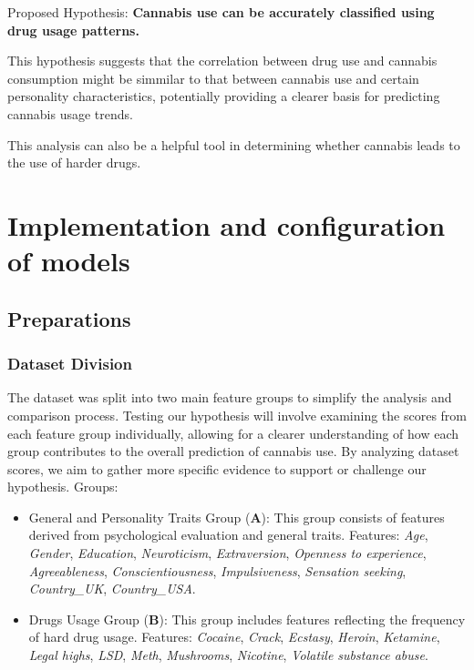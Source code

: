 \documentclass{article}
\begin{document}
Proposed Hypothesis: \textbf{Cannabis use can be accurately classified using drug usage patterns.}

This hypothesis suggests that the correlation between drug use and cannabis consumption might be simmilar to that between cannabis use and certain personality characteristics, potentially providing a clearer basis for predicting cannabis usage trends.

This analysis can also be a helpful tool in determining whether cannabis leads to the use of harder drugs.


\section{Implementation and configuration of models}

\subsection{Preparations}
\subsubsection {Dataset Division}
\hspace{1cm}The dataset was split into two main feature groups to simplify the analysis and comparison process. Testing our hypothesis will involve examining the scores from each feature group individually, allowing for a clearer understanding of how each group contributes to the overall prediction of cannabis use. By analyzing dataset scores, we aim to gather more specific evidence to support or challenge our hypothesis. Groups:
\begin{itemize}

\item General and Personality Traits Group (\textbf{A}):
    This group consists of features derived from psychological evaluation and general traits. \newline Features: \textit{Age}, \textit{Gender}, \textit{Education}, \textit{Neuroticism}, \textit{Extraversion}, \textit{Openness to experience}, \textit{Agreeableness}, \textit{Conscientiousness}, \textit{Impulsiveness}, \textit{Sensation seeking}, \textit{Country\_UK}, \textit{Country\_USA}.

\item Drugs Usage Group (\textbf{B}):
    This group includes features reflecting the frequency of hard drug usage.
    \newline Features: \textit{Cocaine}, \textit{Crack}, \textit{Ecstasy}, \textit{Heroin}, \textit{Ketamine}, \textit{Legal highs}, \textit{LSD}, \textit{Meth}, \textit{Mushrooms}, \textit{Nicotine}, \textit{Volatile substance abuse}.
    \end{itemize}
\end{document}
